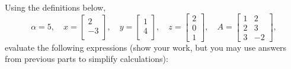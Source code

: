 \documentclass{article}
\def\blu#1{{\color{blu}#1}}
\begin{document}
\noindent Using the definitions below,
\[
\alpha = 5,\quad
x = \left[\begin{array}{c}
2\\
-3\\
\end{array}\right], \quad
y = \left[\begin{array}{c}
1\\
4\\
\end{array}\right],\quad
z = \left[\begin{array}{c}
2\\
0\\
1\end{array}\right],
\quad
A = \left[\begin{array}{ccc}
1 & 2\\
2 & 3\\
3 & -2
\end{array}\right],
\]
\blu{evaluate the following expressions} (show your work, but you may use answers from previous parts to simplify calculations):\\
\end{document}
